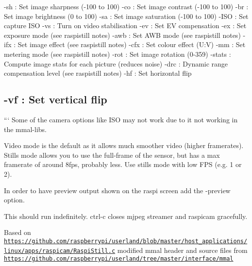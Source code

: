 -\/sh \+: Set image sharpness (-\/100 to 100) -\/co \+: Set image contrast (-\/100 to 100) -\/br \+: Set image brightness (0 to 100) -\/sa \+: Set image saturation (-\/100 to 100) -\/\+I\+S\+O \+: Set capture I\+S\+O -\/vs \+: Turn on video stabilisation -\/ev \+: Set E\+V compensation -\/ex \+: Set exposure mode (see raspistill notes) -\/awb \+: Set A\+W\+B mode (see raspistill notes) -\/ifx \+: Set image effect (see raspistill notes) -\/cfx \+: Set colour effect (U\+:V) -\/mm \+: Set metering mode (see raspistill notes) -\/rot \+: Set image rotation (0-\/359) -\/stats \+: Compute image stats for each picture (reduces noise) -\/drc \+: Dynamic range compensation level (see raspistill notes) -\/hf \+: Set horizontal flip \subsection*{-\/vf \+: Set vertical flip }

``` Some of the camera options like I\+S\+O may not work due to it not working in the mmal-\/libs.

Video mode is the default as it allows much smoother video (higher framerates). Stills mode allows you to use the full-\/frame of the sensor, but has a max framerate of around 8fps, probably less. Use stills mode with low F\+P\+S (e.\+g. 1 or 2).

In order to have preview output shown on the raspi screen add the -\/preview option.

This should run indefinitely. ctrl-\/c closes mjpeg streamer and raspicam gracefully.

Based on \href{https://github.com/raspberrypi/userland/blob/master/host_applications/linux/apps/raspicam/RaspiStill.c}{\tt https\+://github.\+com/raspberrypi/userland/blob/master/host\+\_\+applications/linux/apps/raspicam/\+Raspi\+Still.\+c} modified mmal header and source files from \href{https://github.com/raspberrypi/userland/tree/master/interface/mmal}{\tt https\+://github.\+com/raspberrypi/userland/tree/master/interface/mmal} 
